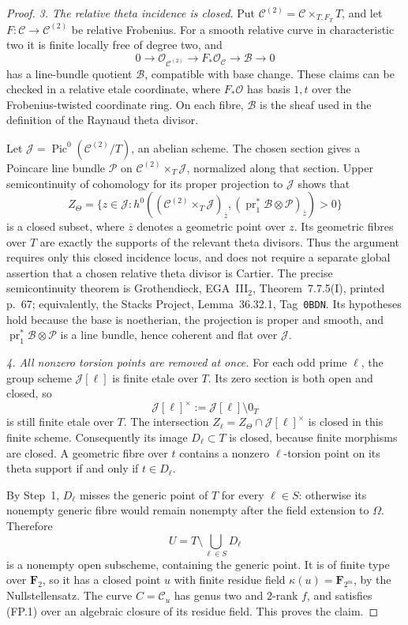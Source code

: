 \begin{proof}
\emph{3. The relative theta incidence is closed.}
Put $\mathcal C^{(2)}=\mathcal C\times_{T,F_T}T$, and let
$F:\mathcal C\to\mathcal C^{(2)}$ be relative Frobenius.
For a smooth relative curve in characteristic two it is finite locally
free of degree two, and
\[
 0\longrightarrow\mathcal O_{\mathcal C^{(2)}}
 \longrightarrow F_*\mathcal O_{\mathcal C}
 \longrightarrow\mathcal B\longrightarrow0
 \tag{FP.2}
\]
has a line-bundle quotient $\mathcal B$, compatible with base change.
These claims can be checked in a relative etale coordinate, where
$F_*\mathcal O$ has basis $1,t$ over the Frobenius-twisted coordinate
ring.  On each fibre, $\mathcal B$ is the sheaf used in the definition
of the Raynaud theta divisor.

Let $\mathcal J=\operatorname{Pic}^0(\mathcal C^{(2)}/T)$, an abelian
scheme.  The chosen section gives a Poincare line bundle $\mathcal P$
on $\mathcal C^{(2)}\times_T\mathcal J$, normalized along that section.
Upper semicontinuity of cohomology for its proper projection to
$\mathcal J$ shows that
\[
 Z_\Theta=
 \{z\in\mathcal J:
 h^0((\mathcal C^{(2)}\times_T\mathcal J)_{\overline z},
       (\operatorname{pr}_1^*\mathcal B\otimes\mathcal P)_{\overline z})>0\}
 \tag{FP.3}
\]
is a closed subset, where $\overline z$ denotes a geometric point
over $z$.  Its geometric fibres over $T$ are
exactly the supports of the relevant theta divisors.  Thus the
argument requires only this closed incidence locus, and does not
require a separate global assertion that a chosen relative theta
divisor is Cartier.  The precise semicontinuity theorem is
Grothendieck, EGA~III$_2$, Theorem~7.7.5(I), printed p.~67;
equivalently, the Stacks Project, Lemma~36.32.1, Tag~\texttt{0BDN}.
Its hypotheses hold because the base is noetherian, the projection
is proper and smooth, and
$\operatorname{pr}_1^*\mathcal B\otimes\mathcal P$ is a line bundle,
hence coherent and flat over $\mathcal J$.

\emph{4. All nonzero torsion points are removed at once.}
For each odd prime $\ell$, the group scheme $\mathcal J[\ell]$ is
finite etale over $T$.  Its zero section is both open and closed, so
\[
 \mathcal J[\ell]^\times:=\mathcal J[\ell]\setminus0_T
\]
is still finite etale over $T$.  The intersection
$Z_\ell=Z_\Theta\cap\mathcal J[\ell]^\times$ is closed in this finite
scheme.  Consequently its image $D_\ell\subset T$ is closed, because
finite morphisms are closed.  A geometric fibre over $t$ contains a
nonzero $\ell$-torsion point on its theta support if and only if
$t\in D_\ell$.

By Step~1, $D_\ell$ misses the generic point of $T$ for every
$\ell\in S$: otherwise its nonempty generic fibre would remain
nonempty after the field extension to $\Omega$.  Therefore
\[
 U=T\setminus\bigcup_{\ell\in S}D_\ell
\]
is a nonempty open subscheme, containing the generic point.
It is of finite type over $\mathbf F_2$, so it has a closed point $u$
with finite residue field $\kappa(u)=\mathbf F_{2^m}$, by the
Nullstellensatz.  The curve $C=\mathcal C_u$ has genus two and
$2$-rank $f$, and satisfies (FP.1) over an algebraic closure of its
residue field.  This proves the claim.
\end{proof}

